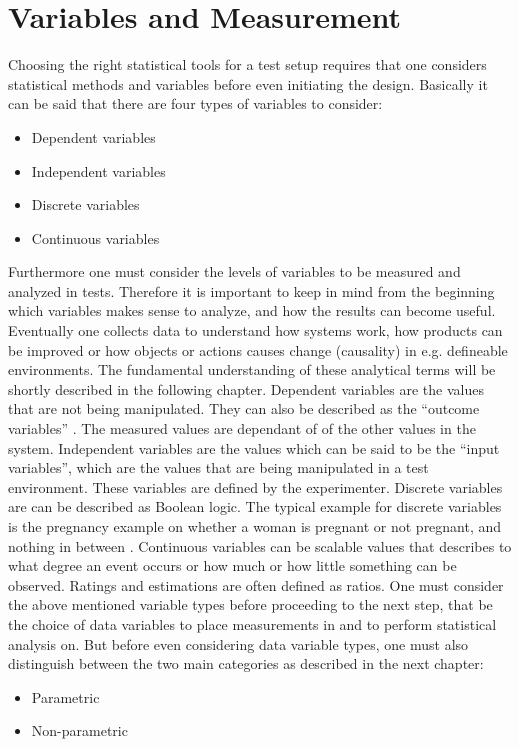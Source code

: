  \section{Variables and Measurement}
 Choosing the right statistical tools for a test setup requires that one considers statistical methods and variables before even initiating the design. Basically it can be said that there are four types of variables to consider: 
\begin{itemize}
  \item Dependent variables
  \item Independent variables
  \item Discrete variables
  \item Continuous variables
\end{itemize}
Furthermore one must consider the levels of variables to be measured and analyzed in tests. Therefore it is important to keep in mind from the beginning which variables makes sense to analyze, and how the results can become useful. Eventually one collects data to understand how systems work, how products can be improved or how objects or actions causes change (causality) in e.g. defineable environments. The fundamental understanding of these analytical terms will be shortly described in the following chapter.
Dependent variables are the values that are not being manipulated. They can also be described as the “outcome variables” \citep[page 21]{Design}. The measured values are dependant of of the other values in the system.
Independent variables are the values which can be said to be the “input variables”, which are the values that are being manipulated in a test environment. These variables are defined by the experimenter.
Discrete variables are can be described as Boolean logic. The typical example for discrete variables is the pregnancy example on whether a woman is pregnant or not pregnant, and nothing in between \citep[page 9]{Design}.
Continuous variables can be scalable values that describes to what degree an event occurs or how much or how little something can be observed. Ratings and estimations are often defined as ratios. 
One must consider the above mentioned variable types before proceeding to the next step, that be the choice of data variables to place measurements in and to perform statistical analysis on. But before even considering data variable types, one must also distinguish between the two main categories as described in the next chapter: 
\begin{itemize}
\item Parametric
\item Non-parametric
\end{itemize}
